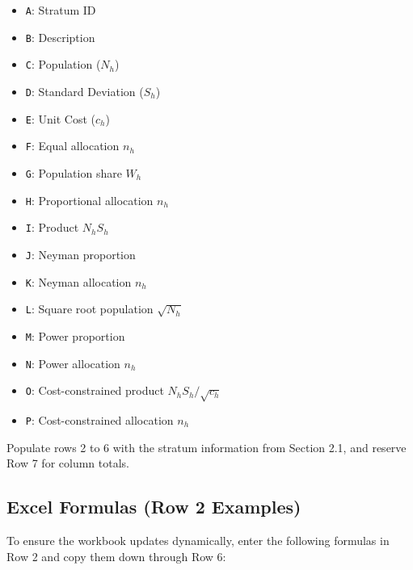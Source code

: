 \documentclass[11pt, a4paper]{article}
\begin{document}
\begin{itemize}
    \item \texttt{A}: Stratum ID
    \item \texttt{B}: Description
    \item \texttt{C}: Population ($N_h$)
    \item \texttt{D}: Standard Deviation ($S_h$)
    \item \texttt{E}: Unit Cost ($c_h$)
    \item \texttt{F}: Equal allocation $n_h$
    \item \texttt{G}: Population share $W_h$
    \item \texttt{H}: Proportional allocation $n_h$
    \item \texttt{I}: Product $N_h S_h$
    \item \texttt{J}: Neyman proportion
    \item \texttt{K}: Neyman allocation $n_h$
    \item \texttt{L}: Square root population $\sqrt{N_h}$
    \item \texttt{M}: Power proportion
    \item \texttt{N}: Power allocation $n_h$
    \item \texttt{O}: Cost-constrained product $N_h S_h/\sqrt{c_h}$
    \item \texttt{P}: Cost-constrained allocation $n_h$
\end{itemize}

Populate rows 2 to 6 with the stratum information from Section 2.1, and reserve Row 7 for column totals.

\subsection{Excel Formulas (Row 2 Examples)}
To ensure the workbook updates dynamically, enter the following formulas in Row 2 and copy them down through Row 6:
\end{document}
